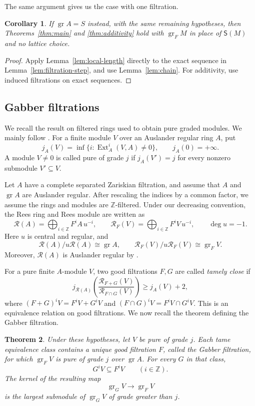 \documentclass[11pt]{article}
\newtheorem{theorem}{Theorem}[section]
\newtheorem{corollary}[theorem]{Corollary}
\theoremstyle{definition}
\newcommand{\gr}{\operatorname{gr}}
\begin{document}
The same argument gives us the case with one filtration.

\begin{corollary}\label{cor:one-stage-cycle}
If $\gr A=S$ instead, with the same remaining hypotheses, then
Theorems~\ref{thm:main} and \ref{thm:additivity} hold with
$\gr_FM$ in place of $\mathsf S(M)$ and no lattice choice.
\end{corollary}
\begin{proof}
Apply Lemma~\ref{lem:local-length} directly to the exact sequence
in Lemma~\ref{lem:filtration-step}, and use Lemma~\ref{lem:chain}.
For additivity, use induced filtrations on exact sequences.
\end{proof}

\subsection{Gabber filtrations}
\label{sec:gabber-filtrations}

We recall the result on filtered rings used to obtain pure graded modules.
We mainly follow \cite[Section~6]{HuWangPadic}.
For a finite module $V$ over an Auslander regular ring $A$, put
\[
 j_A(V)=\inf\{i:\operatorname{Ext}^i_A(V,A)\ne0\},
 \qquad j_A(0)=+\infty.
\]
A module $V\ne0$ is called pure of grade $j$ if
$j_A(V')=j$ for every nonzero submodule $V'\subseteq V$.

Let $A$ have a complete separated Zariskian filtration, and assume
that $A$ and $\gr A$ are Auslander regular. After rescaling the indices by a common factor, 
we assume the rings and modules are $\mathbb{Z}$-filtered. 
Under our decreasing convention, the Rees ring and Rees module are written as
\[
 \mathcal R(A)=\bigoplus_{i\in\mathbb Z}F^iA\,u^{-i},
 \qquad
 \mathcal R_F(V)=\bigoplus_{i\in\mathbb Z}F^iV\,u^{-i},
 \qquad \deg u=-1.
\]
Here $u$ is central and regular, and
\[
 \mathcal R(A)/u\mathcal R(A)\cong\gr A,
 \qquad
 \mathcal R_F(V)/u\mathcal R_F(V)\cong\gr_FV.
\]
Moreover, $\mathcal R(A)$ is Auslander regular by
\cite[Chapter~III, Theorem~3.1.7]{LvO96}.

For a pure finite $A$-module $V$, two good filtrations $F,G$ are called
\emph{tamely close} if
\[
 j_{\mathcal R(A)}\left(
 \frac{\mathcal R_{F+G}(V)}{\mathcal R_{F\cap G}(V)}
 \right)\geq j_A(V)+2,
\]
where $(F+G)^iV=F^iV+G^iV$ and
$(F\cap G)^iV=F^iV\cap G^iV$.
This is an equivalence relation on good filtrations.
We now recall the theorem defining the Gabber filtration.

\begin{theorem}%
\label{thm:gabber-filtration}
Under these hypotheses, let $V$ be pure of grade $j$.
Each tame equivalence class contains a unique good filtration $F$, called the Gabber filtration,
for which $\gr_FV$ is pure of grade $j$ over $\gr A$.
For every $G$ in that class,
\[
 G^iV\subseteq F^iV\qquad(i\in\mathbb Z).
\]
The kernel of the resulting map
\[
 \gr_GV\longrightarrow\gr_FV
\]
is the largest submodule of $\gr_GV$ of grade greater than $j$.
\end{theorem}
\end{document}
